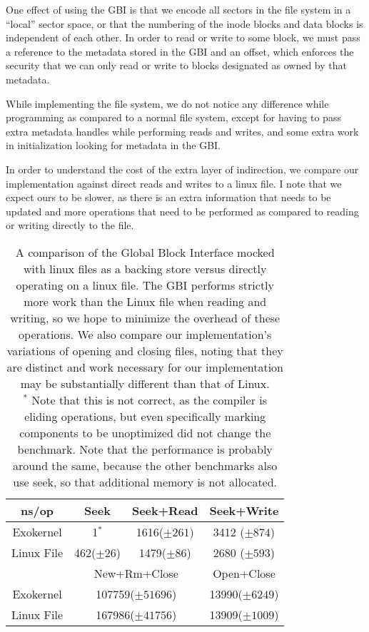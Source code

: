 \documentclass[letterpaper,twocolumn,10pt]{article}
\begin{document}
One effect of using the GBI is that we encode all sectors in the file system in
a ``local'' sector space, or that the numbering of the inode blocks and data blocks is
independent of each other. In order to read or write to some block, we must pass a reference to
the metadata stored in the GBI and an offset, which enforces the security that we can only read
or write to blocks designated as owned by that metadata.

While implementing the file system, we do not notice any difference while programming as compared
to a normal file system, except for having to pass extra metadata handles while performing reads
and writes, and some extra work in initialization looking for metadata in the GBI.

In order to understand the cost of the extra layer of indirection, we compare our implementation
against direct reads and writes to a linux file. I note that we expect ours to be slower, as
there is an extra information that needs to be updated and more operations that need to be
performed as compared to reading or writing directly to the file.

\begin{table}[t]
  \centering
  \begin{tabular}{|c|c|c|c|}
    \hline
    ns/op      & Seek      & Seek+Read  & Seek+Write \\
    \hline
    Exokernel  & 1$^{*}$& 1616($\pm 261$) & 3412 ($\pm 874$) \\
    \hline
    Linux File & 462($\pm 26$)    & 1479($\pm 86$) & 2680 ($\pm 593$) \\
    \hline
               & \multicolumn{2}{c|}{New+Rm+Close} & Open+Close \\
    \hline
    Exokernel  & \multicolumn{2}{c|}{107759($\pm 51696$)} & 13990($\pm 6249$) \\
    \hline
    Linux File & \multicolumn{2}{c|}{167986($\pm 41756$)} & 13909($\pm 1009$) \\
    \hline
  \end{tabular}
  \caption{
    \label{tab:cmp}
    A comparison of the Global Block Interface mocked with linux files as a backing store versus
    directly operating on a linux file. The GBI performs strictly more work than the Linux file
    when reading and writing, so we hope to minimize the overhead of these operations. We also
    compare our implementation's variations of opening and closing files, noting that they are
    distinct and work necessary for our implementation may be substantially different than that
    of Linux.
    \\
    $^*$ Note that this is not correct, as the compiler is
    eliding operations, but even specifically marking components to be unoptimized did not
    change the benchmark. Note that the performance is probably around the same, because
    the other benchmarks also use seek, so that additional memory is not allocated.
  }
\end{table}
\end{document}

